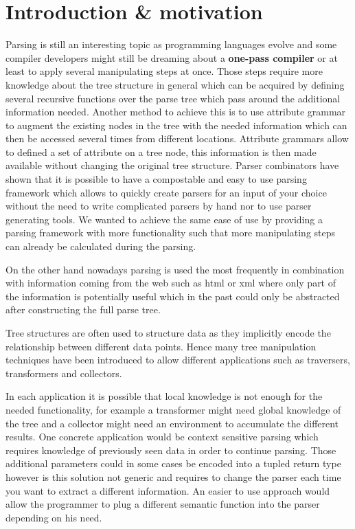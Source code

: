 \section{Introduction \& motivation}
Parsing is still an interesting topic as programming languages evolve and some compiler developers might still be dreaming about a \textbf{one-pass compiler} or at least to apply several manipulating steps at once. Those steps require more knowledge about the tree structure in general which can be acquired by defining several recursive functions over the parse tree which pass around the additional information needed. Another method to achieve this is to use attribute grammar to augment the existing nodes in the tree with the needed information which can then be accessed several times from different locations. Attribute grammars allow to defined a set of attribute on a tree node, this information is then made available without changing the original tree structure.
Parser combinators have shown that it is possible to have a compostable and easy to use parsing framework which allows to quickly create parsers for an input of your choice without the need to write complicated parsers by hand nor to use parser generating tools. We wanted to achieve the same ease of use by providing a parsing framework with more functionality such that more manipulating steps can already be calculated during the parsing.

On the other hand nowadays parsing is used the most frequently in combination with information coming from the web such as html or xml where only part of the information is potentially useful which in the past could only be abstracted after constructing the full parse tree.

Tree structures are often used to structure data as they implicitly encode the relationship between different data points. Hence many tree manipulation techniques have been introduced to allow different applications such as traversers, transformers and collectors.

In each application it is possible that local knowledge is not enough for the needed functionality, for example a transformer might need global knowledge of the tree and a collector might need an environment to accumulate the different results. One concrete application would be context sensitive parsing which requires knowledge of previously seen data in order to continue parsing. Those additional parameters could in some cases be encoded into a tupled return type however is this solution not generic and requires to change the parser each time you want to extract a different information. An easier to use approach would allow the programmer to plug a different semantic function into the parser depending on his need.

